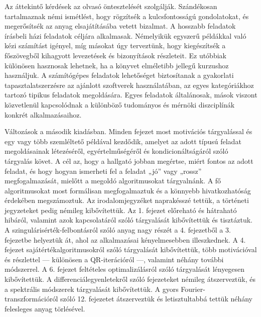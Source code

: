 \documentclass[
  magyar,
  11pt]{article}
\begin{document}
Az áttekintő kérdések az olvasó öntesztelését szolgálják. Szándékosan
tartalmaznak némi ismétlést, hogy rögzítsék a kulcsfontosságú
gondolatokat, és megerősítsék az anyag elsajátításába vetett bizalmat. A
hosszabb feladatok írásbeli házi feladatok céljára alkalmasak.
Némelyikük egyszerű példákkal való kézi számítást igényel, míg másokat
úgy terveztünk, hogy kiegészítsék a főszövegből kihagyott levezetések és
bizonyítások részleteit. Ez utóbbiak különösen hasznosak lehetnek, ha a
könyvet elméletibb jellegű kurzushoz használjuk. A számítógépes
feladatok lehetőséget biztosítanak a gyakorlati tapasztalatszerzésre az
ajánlott szoftverek használatában, az egyes kategóriákhoz tartozó
tipikus feladatok megoldására. Egyes feladatok általánosak, mások
viszont közvetlenül kapcsolódnak a különböző tudományos és mérnöki
diszciplínák konkrét alkalmazásaihoz.

Változások a második kiadásban. Minden fejezet most motivációs
tárgyalással és egy vagy több szemléltető példával kezdődik, amelyet az
adott típusú feladat megoldásainak létezéséről, egyértelműségéről és
kondicionáltságáról szóló tárgyalás követ. A cél az, hogy a hallgató
jobban megértse, miért fontos az adott feladat, és hogy hogyan ismerheti
fel a feladat „jó'' vagy „rossz'' megfogalmazását, mielőtt a megoldó
algoritmusokat tárgyalnánk. A fő algoritmusokat most formálisan
megfogalmaztuk és a könnyebb hivatkozhatóság érdekében megszámoztuk. Az
irodalomjegyzéket naprakésszé tettük, a történeti jegyzeteket pedig
némileg kibővítettük. Az 1. fejezet előreható és hátraható hibáról,
valamint azok kapcsolatáról szóló tárgyalását kibővítettük és
tisztáztuk. A szingulárisérték-felbontásról szóló anyag nagy részét a 4.
fejezetből a 3. fejezetbe helyeztük át, ahol az alkalmazásai
kényelmesebben illeszkednek. A 4. fejezet sajátértékalgoritmusokról
szóló tárgyalását kibővítettük, több motivációval és részlettel ---
különösen a QR-iterációról ---, valamint néhány további módszerrel. A 6.
fejezet feltételes optimalizálásról szóló tárgyalását lényegesen
kibővítettük. A differenciálegyenletekről szóló fejezeteket némileg
átszerveztük, és a spektrális módszerek tárgyalását kibővítettük. A
gyors Fourier-transzformációról szóló 12. fejezetet átszerveztük és
letisztultabbá tettük néhány felesleges anyag törlésével.
\end{document}

